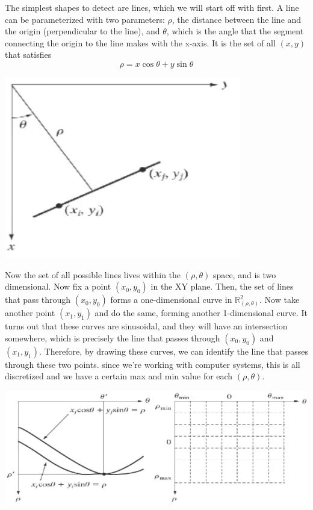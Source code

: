\documentclass{article}
\begin{document}
    The simplest shapes to detect are lines, which we will start off with first. A line can be parameterized with two parameters: $\rho$, the distance between the line and the origin (perpendicular to the line), and $\theta$, which is the angle that the segment connecting the origin to the line makes with the x-axis. It is the set of all $(x, y)$ that satisfies 
    \[\rho = x \cos{\theta} + y \sin{\theta}\]
    \begin{center}
        \includegraphics[scale=0.4]{img/line.png}
    \end{center}
    Now the set of all possible lines lives within the $(\rho, \theta)$ space, and is two dimensional. Now fix a point $(x_0, y_0)$ in the XY plane. Then, the set of lines that pass through $(x_0, y_0)$ forms a one-dimensional curve in $\mathbb{R}^2_{(\rho, \theta)}$. Now take another point $(x_1, y_1)$ and do the same, forming another 1-dimensional curve. It turns out that these curves are sinusoidal, and they will have an intersection somewhere, which is precisely the line that passes through $(x_0, y_0)$ and $(x_1, y_1)$. Therefore, by drawing these curves, we can identify the line that passes through these two points. since we're working with computer systems, this is all discretized and we have a certain max and min value for each $(\rho, \theta)$. 
    \begin{center}
        \includegraphics[scale=0.4]{img/rho_theta.png}
    \end{center}
\end{document}
